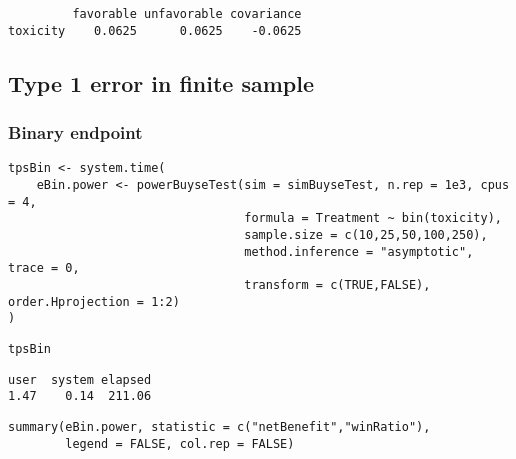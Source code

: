 \documentclass[12pt]{article}
\begin{document}
\begin{verbatim}
         favorable unfavorable covariance
toxicity    0.0625      0.0625    -0.0625
\end{verbatim}

\clearpage

\subsection{Type 1 error in finite sample}
\label{sec:orgab4b0a3}

\subsubsection{Binary endpoint}
\label{sec:org6f6c790}
\lstset{language=r,label= ,caption= ,captionpos=b,numbers=none}
\begin{lstlisting}
tpsBin <- system.time(
	eBin.power <- powerBuyseTest(sim = simBuyseTest, n.rep = 1e3, cpus = 4,
								 formula = Treatment ~ bin(toxicity),
								 sample.size = c(10,25,50,100,250),                                   
								 method.inference = "asymptotic", trace = 0,
								 transform = c(TRUE,FALSE), order.Hprojection = 1:2)
)
\end{lstlisting}

\lstset{language=r,label= ,caption= ,captionpos=b,numbers=none}
\begin{lstlisting}
tpsBin
\end{lstlisting}

\begin{verbatim}
user  system elapsed 
1.47    0.14  211.06
\end{verbatim}

\lstset{language=r,label= ,caption= ,captionpos=b,numbers=none}
\begin{lstlisting}
summary(eBin.power, statistic = c("netBenefit","winRatio"), 
		legend = FALSE, col.rep = FALSE)
\end{lstlisting}
\end{document}
